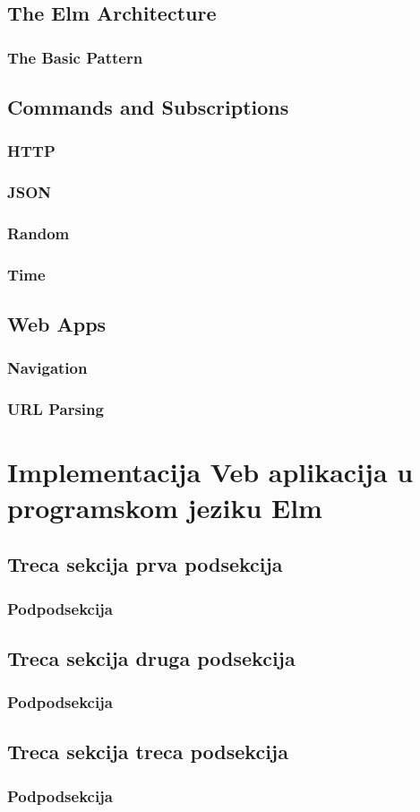 \documentclass{viser-thesis}
\begin{document}
\subsection{The Elm Architecture}
\subsubsection{The Basic Pattern}

\subsection{Commands and Subscriptions}
\subsubsection{HTTP}
\subsubsection{JSON}
\subsubsection{Random}
\subsubsection{Time}

\subsection{Web Apps}
\subsubsection{Navigation}
\subsubsection{URL Parsing}

\newpage

\section{Implementacija Veb aplikacija u programskom jeziku Elm}
\newpage
\subsection{Treca sekcija prva podsekcija}
\newpage
\subsubsection{Podpodsekcija}
\newpage
\subsection{Treca sekcija druga podsekcija}
\newpage
\subsubsection{Podpodsekcija}
\newpage
\subsection{Treca sekcija treca podsekcija}
\newpage
\subsubsection{Podpodsekcija}
\newpage

\printindex
\newpage

\printbibliography[heading=bibintoc]
\end{document}
